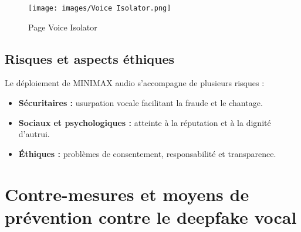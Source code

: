 \documentclass[memoire, 12pt]{report}
\begin{document}
\begin{center}
\begin{figure}[h] 
    \centering
    \texttt{[image: images/Voice Isolator.png]} 
    \caption{Page Voice Isolator}
    \label{fig:vi}
\end{figure}
\end{center}







\subsection{Risques et aspects éthiques}
Le déploiement de MINIMAX audio s’accompagne de plusieurs risques :
\begin{itemize}
    \item \textbf{Sécuritaires :} usurpation vocale facilitant la fraude et le chantage.
    \item \textbf{Sociaux et psychologiques :} atteinte à la réputation et à la dignité d’autrui.
    \item \textbf{Éthiques :} problèmes de consentement, responsabilité et transparence.  
\end{itemize}

\section{Contre-mesures et moyens de prévention contre le deepfake vocal}
\end{document}
